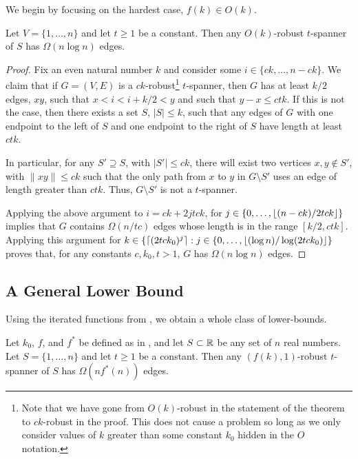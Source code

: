 \documentclass{patmorin}
\begin{document}
We begin by focusing on the hardest case, $f(k) \in O(k)$.

\begin{thm}
  Let $V=\{1,\ldots,n\}$ and let $t\ge 1$ be a constant.  Then any
  $O(k)$-robust $t$-spanner of $S$ has $\Omega(n\log n)$ edges.
\end{thm}

\begin{proof}
  Fix an even natural number $k$ and consider some
  $i\in\{ck,\ldots,n-ck\}$.  We claim that if $G=(V,E)$ is a
  $ck$-robust\footnote{Note that we have gone from $O(k)$-robust in the
  statement of the theorem to $ck$-robust in the proof.  This does not
  cause a problem so long as we only consider values of $k$ greater
  than some constant $k_0$ hidden in the $O$ notation.} $t$-spanner,
  then $G$ has at least $k/2$ edges, $xy$, such that $x < i < i+k/2 <
  y$ and such that $y-x \le ctk$.  If this is not the case, then there
  exists a set $S$, $|S|\le k$, such that any edges of $G$ with one
  endpoint to the left of $S$ and one endpoint to the right of $S$
  have length at least $ctk$.

  In particular, for any $S'\supseteq S$, with $|S'|\le ck$, there will
  exist two vertices $x,y\not\in S'$, with $\|xy\|\le ck$ such that the
  only path from $x$ to $y$ in $G\setminus S'$ uses an edge of length
  greater than $ctk$.  Thus, $G\setminus S'$ is not a $t$-spanner.

  Applying the above argument to $i=ck+2jtck$, for
  $j\in\{0,\ldots,{\lfloor (n-ck)/2tck \rfloor}\}$ implies that $G$ contains
  $\Omega(n/tc)$ edges whose length is in the range $[k/2,ctk]$.
  Applying this argument for $k\in\{{\lceil (2tck_0)^{j} \rceil} :
  j\in\{0,\ldots,{\lfloor (\log n)/\log(2tck_0) \rfloor}\}$ proves that, for any
  constants $c,k_0,t>1$, $G$ has $\Omega(n\log n)$ edges.
\end{proof}


\subsection{A General Lower Bound}

Using the iterated functions from , we obtain a whole
class of lower-bounds.

\begin{thm}
  Let $k_0$, $f$, and $f^*$ be defined as in , and let
  $S\subset \mathbb{R}$ be any set of $n$ real numbers.  Let $S=\{1,\ldots,n\}$
  and let $t\ge 1$ be a constant.  Then any $(f(k),1)$-robust $t$-spanner
  of $S$ has $\Omega(nf^*(n))$ edges.
\end{thm}
\end{document}
